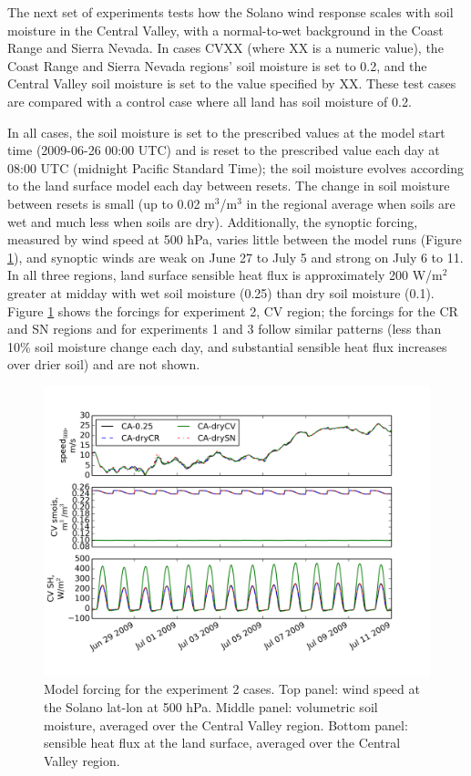 The next set of experiments tests how the Solano wind response scales with soil moisture in the Central Valley, with a normal-to-wet background in the Coast Range and Sierra Nevada.  In cases CVXX (where XX is a numeric value), the Coast Range and Sierra Nevada regions' soil moisture is set to 0.2, and the Central Valley soil moisture is set to the value specified by XX.  These test cases are compared with a control case where all land has soil moisture of 0.2.

In all cases, the soil moisture is set to the prescribed values at the model start time (2009-06-26 00:00 UTC) and is reset to the prescribed value each day at 08:00 UTC (midnight Pacific Standard Time); the soil moisture evolves according to the land surface model each day between resets.  The change in soil moisture between resets is small (up to 0.02 m$^3$/m$^3$ in the regional average when soils are wet and much less when soils are dry).  Additionally, the synoptic forcing, measured by wind speed at 500 hPa, varies little between the model runs (Figure \ref{fig:windSol_forcings}), and synoptic winds are weak on June 27 to July 5 and strong on July 6 to 11.  In all three regions, land surface sensible heat flux is approximately 200 W/m$^2$ greater at midday with wet soil moisture (0.25) than dry soil moisture (0.1).  Figure \ref{fig:windSol_forcings} shows the forcings for experiment 2, CV region; the forcings for the CR and SN regions and for experiments 1 and 3 follow similar patterns (less than 10\% soil moisture change each day, and substantial sensible heat flux increases over drier soil) and are not shown.

\begin{figure}[here]
\includegraphics[width=1\textwidth]{ch3-wind/img/forcing.png}
\caption{Model forcing for the experiment 2 cases.  Top panel: wind speed at the Solano lat-lon at 500 hPa.  Middle panel: volumetric soil moisture, averaged over the Central Valley region.  Bottom panel: sensible heat flux at the land surface, averaged over the Central Valley region.}
\label{fig:windSol_forcings}
\end{figure}


